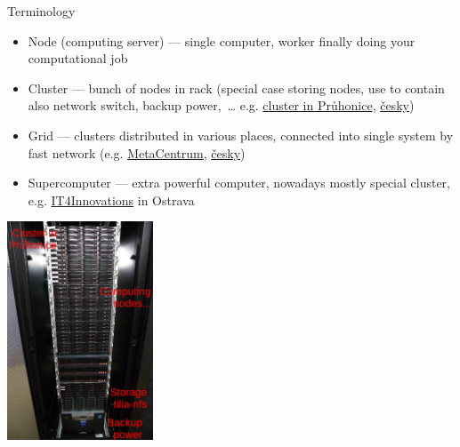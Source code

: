 \documentclass[compress, xelatex, 11pt, xcolor=svgnames, aspectratio=169,
	hyperref={
		bookmarks=true,
		unicode=true,
		colorlinks=true,
		pdftitle={Linux, command line and MetaCentrum},
		plainpages=false,
		pdfauthor={Vojtech Zeisek},
		pdfsubject={Course about use of Linux command line, writing shell scripts and using MetaCentrum of CESNET},
		pdfcreator={XeLaTeX},
		pdfkeywords={Linux, GNU, BASH, shell, command line, MetaCentrum},
		linkcolor=DarkRed, %
		anchorcolor=DarkBlue, %
		citecolor=Indigo, %
		filecolor=NavyBlue, %
		menucolor=DarkMagenta, %
		urlcolor=DarkBlue, %
		},
	url={hyphens, lowtilde} %
	]{beamer}
\begin{document}
\begin{frame}{Terminology}
	\begin{multicols}{2}
		\begin{itemize}
			\item Node (computing server) --- single computer, worker finally doing your computational job
			\item Cluster --- bunch of nodes in rack (special case storing nodes, use to contain also network switch, backup power,~\ldots{ } e.g. \href{https://sorbus.ibot.cas.cz/en/hw}{cluster in Průhonice}, \href{https://sorbus.ibot.cas.cz/cs/hw}{česky})
			\item Grid --- clusters distributed in various places, connected into single system by fast network (e.g. \href{https://www.metacentrum.cz/en/Sluzby/Grid/}{MetaCentrum}, \href{https://www.metacentrum.cz/cs/Sluzby/Grid/}{česky})
			\item Supercomputer --- extra powerful computer, nowadays mostly special cluster, e.g. \href{https://www.it4i.cz/}{IT4Innovations} in Ostrava
		\end{itemize}
		\begin{center}
			\includegraphics[height=6.5cm]{cluster_rack.jpg}
		\end{center}
	\end{multicols}
\end{frame}
\end{document}
